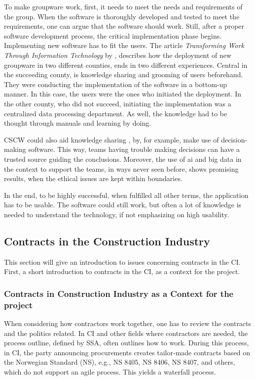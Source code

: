 To make groupware work, first, it needs to meet the needs and requirements of the group. When the software is thoroughly developed and tested to meet the requirements, one can argue that the software should work. Still, after a proper software development process, the critical implementation phase begins. Implementing new software has to fit the users. The article \textit{Transforming Work Through Information Technology} by \cite{Robey&Sahay}, describes how the deployment of new groupware in two different counties, ends in two different experiences. Central in the succeeding county, is knowledge sharing and grooming of users beforehand. They were conducting the implementation of the software in a bottom-up manner. In this case, the users were the ones who initiated the deployment. In the other county, who did not succeed, initiating the implementation was a centralized data processing department. As well, the knowledge had to be thought through manuals and learning by doing.

CSCW could also aid knowledge sharing \cite{monplaisir2002enhancing}, by, for example, make use of decision-making software. This way, teams having trouble making decisions can have a trusted source guiding the conclusions. Moreover, the use of ai and big data in the context to support the teams, in ways never seen before, shows promising results, when the ethical issues  \cite{jung2017computational} are kept within boundaries.   

In the end, to be highly successful, when fulfilled all other terms, the application has to be usable. The software could still work, but often a lot of knowledge is needed to understand the technology, if not emphasizing on high usability. 

\subsection{Contracts in the Construction Industry}
This section will give an introduction to issues concerning contracts in the CI. First, a short introduction to contracts in the CI, as a context for the project. 

\subsubsection*{Contracts in Construction Industry as a Context for the project}
When considering how contractors work together, one has to review the contracts and the politics related. In CI and other fields where contractors are needed, the process outline, defined by SSA, often outlines how to work. During this process, in CI, the party announcing procurements creates tailor-made contracts based on the Norwegian Standard (NS), e.g., NS 8405, NS 8406, NS 8407, and others, which do not support an agile process. This yields a waterfall process. 

